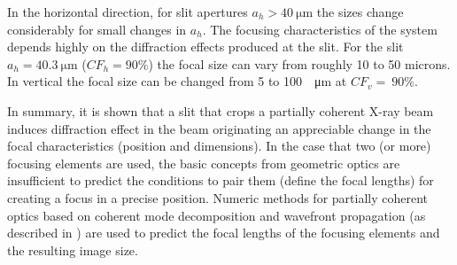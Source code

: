 \documentclass[9pt,twocolumn,twoside]{osajnl}
\begin{document}
In the horizontal direction, for slit apertures $a_h>\SI{40}{\micro\meter}$ the sizes change considerably for small changes in $a_h$. The focusing characteristics of the system depends highly on the diffraction effects produced at the slit. For the slit $a_h=\SI{40.3}{\micro\meter}$ ($CF_h=90\%$) the focal size can vary from roughly 10 to 50 microns.  In vertical the focal size can be changed from 5 to 100~\SI{}{\micro\meter} at $CF_v=~90\%$.

In summary, it is shown that a slit that crops a partially coherent X-ray beam induces diffraction effect in the beam originating an appreciable change in the focal characteristics (position and dimensions). In the case that two (or more) focusing elements are used, the basic concepts from geometric optics are insufficient to predict the conditions to pair them (define the focal lengths) for creating a focus in a precise position. Numeric methods for partially coherent optics based on coherent mode decomposition and wavefront propagation (as described in \cite{delrio2021pairing}) are used to predict the focal lengths of the focusing elements and the resulting image size.   







\end{document}
